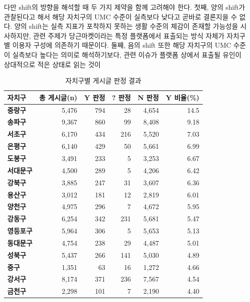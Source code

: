 다만 shift의 방향을 해석할 때 두 가지 제약을 함께 고려해야 한다. 첫째, 양의 shift가 관찰된다고 해서 해당 자치구의 UMC 수준이 실측보다 낮다고 곧바로 결론지을 수 없다. 양의 shift는 실측 지표가 포착하지 못하는 생활 수준의 체감이 존재할 가능성을 시사하지만, 관련 주제가 당근마켓이라는 특정 플랫폼에서 표출되는 방식 자체가 자치구별 이용자 구성에 의존하기 때문이다. 둘째, 음의 shift 또한 해당 자치구의 UMC 수준이 실측보다 높다는 의미로 해석하기보다, 관련 이슈가 플랫폼 상에서 표출될 유인이 상대적으로 적은 상태로 읽는 것이

\begin{table}[htbp]
  \centering\small
  \caption{자치구별 게시글 판정 결과}
  \label{tab:7-district-cls}
  \begin{tabularx}{\textwidth}{l r r r r r}
    \toprule
    \textbf{자치구} & \textbf{총 게시글(n)} & \textbf{Y 판정} & \textbf{? 판정} & \textbf{N 판정} & \textbf{Y 비율(\%)} \\
    \midrule
    \textbf{중랑구}   & 5,476  & 794 & 28  & 4,654  & 14.5 \\
    \textbf{송파구}   & 9,367  & 860 & 99  & 8,408  & 9.18 \\
    \textbf{서초구}   & 6,170  & 434 & 216 & 5,520  & 7.03 \\
    \textbf{은평구}   & 6,140  & 429 & 50  & 5,661  & 6.99 \\
    \textbf{도봉구}   & 3,491  & 233 & 5   & 3,253  & 6.67 \\
    \textbf{서대문구} & 4,500  & 289 & 5   & 4,206  & 6.42 \\
    \textbf{강북구}   & 3,885  & 247 & 31  & 3,607  & 6.36 \\
    \textbf{용산구}   & 3,012  & 181 & 12  & 2,819  & 6.01 \\
    \textbf{양천구}   & 4,975  & 296 & 7   & 4,672  & 5.95 \\
    \textbf{강동구}   & 6,254  & 342 & 231 & 5,681  & 5.47 \\
    \textbf{영등포구} & 5,964  & 306 & 5   & 5,653  & 5.13 \\
    \textbf{동대문구} & 4,754  & 238 & 29  & 4,487  & 5.01 \\
    \textbf{성북구}   & 5,437  & 266 & 141 & 5,030  & 4.89 \\
    \textbf{중구}     & 1,351  & 63  & 16  & 1,272  & 4.66 \\
    \textbf{강서구}   & 8,174  & 371 & 236 & 7,567  & 4.54 \\
    \textbf{금천구}   & 2,298  & 101 & 7   & 2,190  & 4.40 \\

\end{tabularx}
\end{table}
